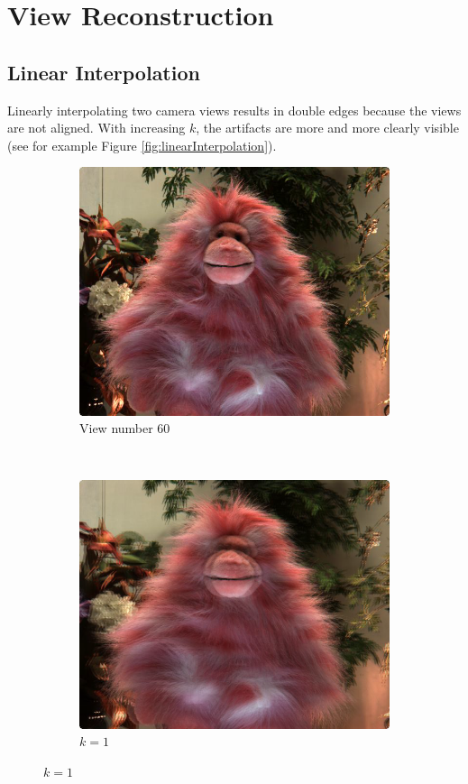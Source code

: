 \documentclass[a4paper]{article}
\begin{document}
\section*{View Reconstruction}
\subsection*{Linear Interpolation}
Linearly interpolating two camera views results in double edges because the views are not aligned. With increasing $k$, the artifacts are more and more clearly visible (see for example Figure \ref{fig:linearInterpolation}). 
\begin{figure}[ht]
	\begin{subfigure}[h]{0.48\textwidth}
	  \includegraphics[width=\textwidth]{view60}
	  \caption*{View number 60}
	\end{subfigure}
    	~
	\begin{subfigure}[h]{0.48\textwidth}
	  \centering
	  \includegraphics[width=\textwidth]{LinearInterpolation60_61}
	  \caption*{$k=1$}
	\end{subfigure}
	

\end{figure}
\end{document}
